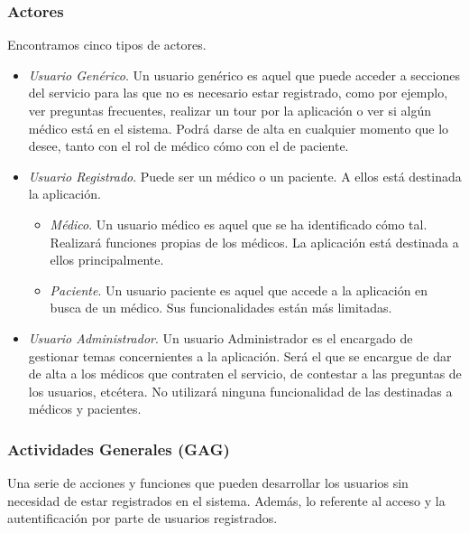 				\subsubsection{Actores} %
				\label{sub:actores}
					Encontramos cinco tipos de actores.
					\begin{itemize}
						\item \textit{Usuario Genérico}. Un usuario genérico es aquel que puede acceder a secciones del servicio para las que no es necesario estar registrado, como por ejemplo, ver preguntas frecuentes, realizar un tour por la aplicación o ver si algún médico está en el sistema. Podrá darse de alta en cualquier momento que lo desee, tanto con el rol de médico cómo con el de paciente.
						\item \textit{Usuario Registrado}. Puede ser un médico o un paciente. A ellos está destinada la aplicación.
							\begin{itemize}
								\item \textit{Médico}. Un usuario médico es aquel que se ha identificado cómo tal. Realizará funciones propias de los médicos. La aplicación está destinada a ellos principalmente.
								\item \textit{Paciente}. Un usuario paciente es aquel que accede a la aplicación en busca de un médico. Sus funcionalidades están más limitadas.
							\end{itemize}
						\item \textit{Usuario Administrador}. Un usuario Administrador es el encargado de gestionar temas concernientes a la aplicación. Será el que se encargue de dar de alta a los médicos que contraten el servicio, de contestar a las preguntas de los usuarios, etcétera. No utilizará ninguna funcionalidad de las destinadas a médicos y pacientes.

					\end{itemize}
				\newpage
				\subsubsection{Actividades Generales (GAG)} %
				\label{sub:actividades_generales_gag_}

					Una serie de acciones y funciones que pueden desarrollar los usuarios sin necesidad de estar registrados en el sistema. Además, lo referente al acceso y la autentificación por parte de usuarios registrados.
					\bigskip


